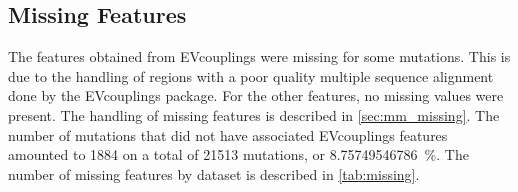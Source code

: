 \subsection{Missing Features}
The features obtained from EVcouplings were missing for some mutations.
This is due to the handling of regions with a poor quality multiple sequence alignment done by the EVcouplings package.
For the other features, no missing values were present.
The handling of missing features is described in \cref{sec:mm_missing}.
The number of mutations that did not have associated EVcouplings features amounted to \num{1884} on a total of \num{21513} mutations, or \SI{8.75749546786}{\percent}.
The number of missing features by dataset is described in \cref{tab:missing}.

\begin{table}[t]
	\small%
	{\caption[Number of mutations with missing features]{%
			\textbf{Number of mutations with missing features.}
			Table that shows the number of mutations in each dataset that could not be assigned EVcouplings predictions.
			EVcouplings predictions were the only feature that presented some missing values.
		}\label{tab:missing}%
	}%
\end{table}

